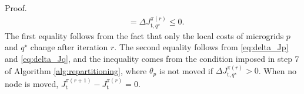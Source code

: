 \begin{pf*}{Proof.}
\begin{align*}
	&=\Delta J^{\pi(r)}_{\mathrm{t},q^{\star}} \leq 0.
	\end{align*}
	The first equality follows from the fact that only the local costs of microgrids $p$ and $q^{\star}$ change after iteration $r$. The second equality follows from \eqref{eq:delta_Jp} and \eqref{eq:delta_Jq}, and the inequality comes from the condition imposed in step 7 of Algorithm \ref{alg:repartitioning}, where $\theta_p$ is not moved if  $\Delta J^{\pi(r)}_{\mathrm{t},q^{\star}} > 0$. When no node is moved, $J^{\pi(r+1)}_{\mathrm{t}}- J^{\pi(r)}_{\mathrm{t}}=0$. \eod
\end{pf*}



